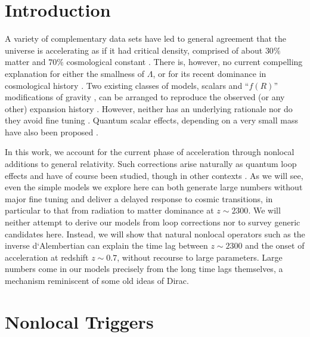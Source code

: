 \documentclass[12pt]{article}
\begin{document}
\section{Introduction}

A variety of complementary data sets \cite{data}
have led to general agreement that the universe is accelerating as if
it had critical density, comprised of about $30\%$ matter and
$70\%$ cosmological constant \cite{analysis}. There is,
however, no current compelling explanation for either the smallness of
$\Lambda$, or for its recent dominance in cosmological history \cite{Lambda}. 
Two existing classes of models, scalars \cite{scalars} and ``$f(R)$'' 
modifications of gravity \cite{NO}, can be arranged to reproduce the observed 
(or any other) expansion history \cite{TW,SRSS,RPW,NO}.
However, neither has an underlying rationale nor do they avoid fine tuning 
\cite{Bludman}. Quantum scalar effects, depending on a very small mass 
have also been proposed \cite{Parker}.

In this work, we account for the current phase of acceleration through
nonlocal additions to general relativity. Such corrections arise naturally
as quantum loop effects and have of course been studied, though in other
contexts \cite{TW,nonloc,SW}. As we will see, even the simple models we 
explore here can both generate large numbers without major fine tuning and 
deliver a delayed response to cosmic transitions, in particular to that 
from radiation to matter dominance at $z \sim 2300$. We will neither 
attempt to derive our models from loop corrections nor to survey generic 
candidates here. Instead, we will show that natural nonlocal operators 
such as the inverse d`Alembertian can explain the time lag between $z \sim 
2300$ and the onset of acceleration at redshift $z \sim 0.7$, without 
recourse to large parameters. Large numbers come in our models precisely
from the long time lags themselves, a mechanism reminiscent of some old
ideas of Dirac.

\section{Nonlocal Triggers}
\end{document}
